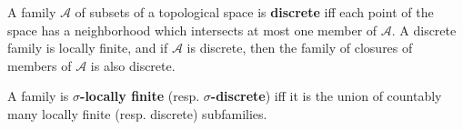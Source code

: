 A family $\mathcal{A}$ of subsets of a topological space is \textbf{discrete} iff each point of the space has a neighborhood which intersects at most one member of $\mathcal{A}$. A discrete family is locally finite, and if $\mathcal{A}$ is discrete, then the family of closures of members of $\mathcal{A}$ is also discrete.

A family is \textbf{$\sigma$-locally finite} (resp. \textbf{$\sigma$-discrete}) iff it is the union of countably many locally finite (resp. discrete) subfamilies.
